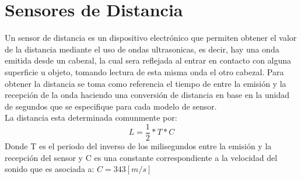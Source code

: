 \documentclass[12pt]{book} %
\begin{document}
	\section{Sensores de Distancia}
Un sensor de distancia es un dispositivo electrónico que permiten obtener el valor de la distancia mediante el uso de ondas ultrasonicas, es decir, hay una onda emitida desde un cabezal, la cual sera reflejada al entrar en contacto con alguna superficie u objeto, tomando lectura de esta misma onda el otro cabezal. Para obtener la distancia se toma como referencia el tiempo de entre la emisión y la recepción de la onda haciendo una conversión de distancia en base en la unidad de segundos que se especifique para cada modelo de sensor. \\
La distancia esta determinada comunmente por:\\
\begin{equation}
L = \dfrac{1}{2} * T * C
\end{equation}
Donde T es el periodo del inverso de los milisegundos entre la emisión y la recepción del sensor y C es una constante correspondiente a la velocidad del sonido que es asociada a: $ C = 343 [m/s]$

%
%	
	
\end{document}
